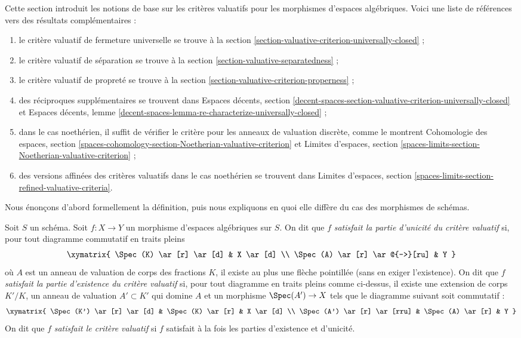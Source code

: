 \noindent
Cette section introduit les notions de base sur les critères valuatifs pour les morphismes
d'espaces algébriques. Voici une liste de références vers des résultats complémentaires :
\begin{enumerate}
\item le critère valuatif de fermeture universelle se trouve à la
section \ref{section-valuative-criterion-universally-closed} ;
\item le critère valuatif de séparation se trouve à la
section \ref{section-valuative-separatedness} ;
\item le critère valuatif de propreté se trouve à la
section \ref{section-valuative-criterion-properness} ;
\item des réciproques supplémentaires se trouvent dans
Espaces décents, section
\ref{decent-spaces-section-valuative-criterion-universally-closed}
et Espaces décents, lemme
\ref{decent-spaces-lemma-re-characterize-universally-closed} ;
\item dans le cas noethérien, il suffit de vérifier le critère pour les
anneaux de valuation discrète, comme le montrent Cohomologie des espaces, section
\ref{spaces-cohomology-section-Noetherian-valuative-criterion} et
Limites d'espaces, section
\ref{spaces-limits-section-Noetherian-valuative-criterion} ;
\item des versions affinées des critères valuatifs dans le cas noethérien
se trouvent dans Limites d'espaces, section
\ref{spaces-limits-section-refined-valuative-criteria}.
\end{enumerate}
Nous énonçons d'abord formellement la définition, puis nous expliquons en quoi elle
diffère du cas des morphismes de schémas.

\begin{definition}
\label{definition-valuative-criterion}
Soit $S$ un schéma.
Soit $f : X \to Y$ un morphisme d'espaces algébriques sur $S$.
On dit que $f$ {\it satisfait la partie d'unicité du critère valuatif}
si, pour tout diagramme commutatif en traits pleins
$$
\xymatrix{
\Spec(K) \ar[r] \ar[d] & X \ar[d] \\
\Spec(A) \ar[r] \ar@{-->}[ru] & Y
}
$$
où $A$ est un anneau de valuation de corps des fractions $K$, il existe
au plus une flèche pointillée (sans en exiger l'existence).
On dit que $f$ {\it satisfait la partie d'existence du critère valuatif}
si, pour tout diagramme en traits pleins comme ci-dessus, il existe une extension
de corps $K'/K$, un anneau de valuation $A' \subset K'$ qui domine
$A$ et un morphisme $\Spec(A') \to X$ tels que le diagramme
suivant soit commutatif :
$$
\xymatrix{
\Spec(K') \ar[r] \ar[d] & \Spec(K) \ar[r] & X \ar[d] \\
\Spec(A') \ar[r] \ar[rru] & \Spec(A) \ar[r] & Y
}
$$
On dit que $f$ {\it satisfait le critère valuatif}
si $f$ satisfait à la fois les parties d'existence et d'unicité.
\end{definition}

